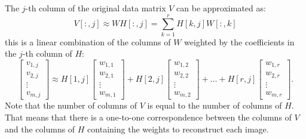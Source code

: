 The $j$-th column of the original data matrix $V$ can be approximated as:
\begin{equation}
    V[:,j] \approx W H[:,j] = \sum_{k=1}^{r} H[k,j] W[:, k]
\end{equation}
this is a linear combination of the columns of $W$ weighted by the coefficients in the $j$-th column of $H$:
\begin{equation}
    \begin{bmatrix}
        v_{1,j} \\
        v_{2,j} \\
        \vdots \\
        v_{m,j}
    \end{bmatrix} \approx H[1,j]
    \begin{bmatrix}
        w_{1,1} \\
        w_{2,1} \\
        \vdots \\
        w_{m,1}
    \end{bmatrix} + H[2,j]
    \begin{bmatrix}
        w_{1,2} \\
        w_{2,2} \\
        \vdots \\
        w_{m,2}
    \end{bmatrix} + \ldots + H[r,j]
    \begin{bmatrix}
        w_{1,r} \\
        w_{2,r} \\
        \vdots \\
        w_{m,r}
    \end{bmatrix}.
\end{equation}
Note that the number of columns of $V$ is equal to the number of columns of $H$. That means that there is a one-to-one correspondence between the columns of $V$ and the columns of $H$ containing the weights to reconstruct each image.
